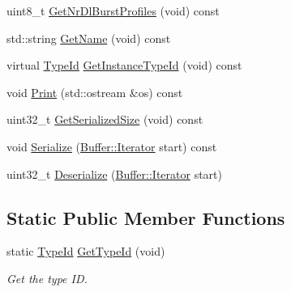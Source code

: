 \begin{DoxyCompactItemize}
\item 
uint8\+\_\+t \hyperlink{classns3_1_1Dcd_aa6109b4fa2e8e98b41ab0f5e699f5c7d}{Get\+Nr\+Dl\+Burst\+Profiles} (void) const 
\item 
std\+::string \hyperlink{classns3_1_1Dcd_a8927b18dd8a79b72f170e29febf31960}{Get\+Name} (void) const 
\item 
virtual \hyperlink{classns3_1_1TypeId}{Type\+Id} \hyperlink{classns3_1_1Dcd_aedaee522b7bbeea2a3e6aad00651084d}{Get\+Instance\+Type\+Id} (void) const 
\item 
void \hyperlink{classns3_1_1Dcd_a66cb475b87bf9d96a298db3967dafc03}{Print} (std\+::ostream \&os) const 
\item 
uint32\+\_\+t \hyperlink{classns3_1_1Dcd_a0b7237de70113643da04d916903e3b74}{Get\+Serialized\+Size} (void) const 
\item 
void \hyperlink{classns3_1_1Dcd_a3bf1faa35b39d945f249886f2805de40}{Serialize} (\hyperlink{classns3_1_1Buffer_1_1Iterator}{Buffer\+::\+Iterator} start) const 
\item 
uint32\+\_\+t \hyperlink{classns3_1_1Dcd_aa33549d7776c9d6e07cd8f02602db408}{Deserialize} (\hyperlink{classns3_1_1Buffer_1_1Iterator}{Buffer\+::\+Iterator} start)
\end{DoxyCompactItemize}
\subsection*{Static Public Member Functions}
\begin{DoxyCompactItemize}
\item 
static \hyperlink{classns3_1_1TypeId}{Type\+Id} \hyperlink{classns3_1_1Dcd_a05e1e88b04fcd9400c15414f271f7ed8}{Get\+Type\+Id} (void)
\begin{DoxyCompactList}\small\item\em Get the type ID. \end{DoxyCompactList}\end{DoxyCompactItemize}
